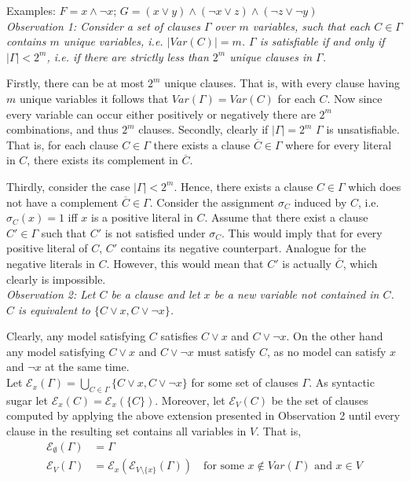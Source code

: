 \documentclass[11pt,a4paper]{article}
\begin{document}
\begin{enumerate}
\begin{itemize}
 Examples:  $F=x\land \neg x$;  $G = (x \lor y) \land (\neg x \lor z)
 \land (\neg z \lor \neg y)$ \\
 
 
 
\emph{Observation 1: Consider a set of clauses $\Gamma$ over $m$ variables, such that each $C \in \Gamma$ contains $m$ unique variables, i.e. $|\mathit{Var}(C)|=m$. $\Gamma$ is satisfiable if and only if $|\Gamma|<2^m$, i.e. if there are strictly less than $2^m$ unique clauses in $\Gamma$. }


Firstly, there can be at most $2^m$ unique clauses. That is, with every clause having $m$ unique variables it follows that $\mathit{Var}(\Gamma)=\mathit{Var}(C)$ for each $C$. Now since every variable can occur either positively or negatively there are $2^m$ combinations, and thus $2^m$ clauses. 
Secondly, clearly if $|\Gamma|=2^m$ $\Gamma$ is unsatisfiable. That is, for each clause $C \in \Gamma$ there exists a clause $\overline{C} \in \Gamma$ where for every literal in $C$, there exists its complement in $\overline{C}$.


Thirdly, consider the case $|\Gamma|<2^m$. Hence, there exists a clause $C \in\Gamma$ which does not have a complement $\overline{C} \in \Gamma$. Consider the assignment $\sigma_{C}$ induced by $C$, i.e. $\sigma_{C}(x)=1$ iff $x$ is a positive literal in $C$. Assume that there exist a clause $C' \in \Gamma$ such that $C'$ is not satisfied under $\sigma_C$. This would imply that for every positive literal of $C$, $C'$ contains its negative counterpart. Analogue for the negative literals in $C$. However, this would mean that $C'$ is actually $\overline{C}$, which clearly is impossible. \\


\emph{Observation 2: Let $C$ be a clause and let $x$ be a new variable not contained in $C$. $C$ is equivalent to $\{C \lor x , C\lor \neg x\}$. }

Clearly, any model satisfying $C$ satisfies $C \lor x $ and $C\lor \neg x$. On the other hand any model satisfying $C \lor x $ and $C \lor \neg x$ must satisfy $C$, as no model can satisfy $x$ and $\neg x$ at the same time.\\

Let $\mathcal{E}_x(\Gamma)= \bigcup_{C \in \Gamma} \{C \lor x , C\lor \neg x\}$ for some set of clauses $\Gamma$. As syntactic sugar let $\mathcal{E}_x(C)=\mathcal{E}_x(\{C\})$. Moreover, let $\mathcal{E}_V(C)$ be the set of clauses computed by applying the above extension presented in Observation 2 until every clause in the resulting set contains all variables in $V$. That is,
\begin{equation*}
\begin{split}
\mathcal{E}_{\emptyset}(\Gamma) &= \Gamma \\
\mathcal{E}_V(\Gamma) &= \mathcal{E}_x(\mathcal{E}_{V \setminus \{x\}}(\Gamma)) \quad \text{for some } x \notin \mathit{Var}(\Gamma) \text{ and } x \in \mathit{V}
\end{split}
\end{equation*}


\end{itemize}
\end{enumerate}
\end{document}
